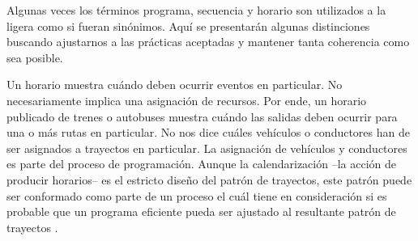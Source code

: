 \documentclass[draft,12pt,headsepline,footsepline,paper=letter]{scrreprt}
\begin{document}
Algunas veces los términos programa, secuencia y horario son utilizados a la ligera como si fueran sinónimos. Aquí se presentarán algunas distinciones buscando ajustarnos a las prácticas aceptadas y mantener tanta coherencia como sea posible.

Un horario muestra cuándo deben ocurrir eventos en particular. No necesariamente implica una asignación de recursos. Por ende, un horario publicado de trenes o autobuses muestra cuándo las salidas deben ocurrir para una o más rutas en particular. No nos dice cuáles vehículos o conductores han de ser asignados a trayectos en particular. La asignación de vehículos y conductores es parte del proceso de programación. Aunque la calendarización –la acción de producir horarios– es el estricto diseño del patrón de trayectos, este patrón puede ser conformado como parte de un proceso el cuál tiene en consideración si es probable que un programa eficiente pueda ser ajustado al resultante patrón de trayectos \cite[p.~48]{wren95scheduling-timetabling}.
\end{document}
